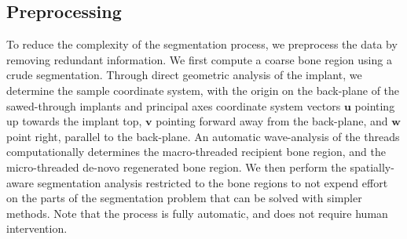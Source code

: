 \subsection{Preprocessing}\label{sec:preprocess}
To reduce the complexity of the segmentation process, we preprocess
the data by removing redundant information.
We first compute a coarse bone region using a crude segmentation. Through
direct geometric analysis of the implant, we determine the sample coordinate
system, with the origin on the back-plane of the sawed-through implants and
principal axes coordinate system vectors $\mathbf{u}$ pointing up towards the
implant top, $\mathbf{v}$ pointing forward away from the back-plane, and
$\mathbf{w}$ point right, parallel to the back-plane. An automatic
wave-analysis of the threads computationally determines the macro-threaded
recipient bone region, and the micro-threaded de-novo regenerated bone region.
We then perform the spatially-aware segmentation analysis restricted to the
bone regions to not expend effort on the parts of the segmentation
problem that can be solved with simpler methods. Note that the process is fully
automatic, and does not require human intervention.



